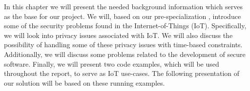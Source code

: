 
In this chapter we will present the needed background information which serves as the base for our project.
We will, based on our pre-specialization \cite{prespecialization}, introduce some of the security problems found in the Internet-of-Things (IoT).
Specifically, we will look into privacy issues associated with IoT.
We will also discuss the possibility of handling some of these privacy issues with time-based constraints.
Additionally, we will discuss some problems related to the development of secure software.
Finally, we will present two code examples, which will be used throughout the report, to serve as IoT use-cases.
The following presentation of our solution will be based on these running examples.
